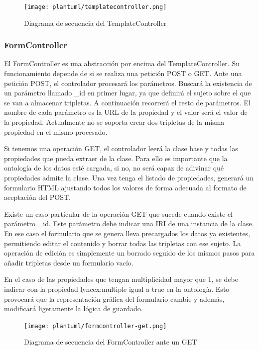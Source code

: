 \documentclass[12pt]{report} %
\begin{document}
\begin{figure}
    \centering
    \texttt{[image: plantuml/templatecontroller.png]}
    \caption{Diagrama de secuencia del TemplateController}
    \label{fig:templatecontroller}
\end{figure}

\subsubsection{FormController}
El FormController es una abstracción por encima del TemplateController.
Su funcionamiento depende de si se realiza una petición POST o GET. Ante una petición POST, el controlador procesará los parámetros.
Buscará la existencia de un parámetro llamado \_id en primer lugar, ya que definirá el sujeto sobre el que se van a almacenar tripletas.
A continuación recorrerá el resto de parámetros. El nombre de cada parámetro es la URL de la propiedad y el valor será el valor de la propiedad.
Actualmente no se soporta crear dos tripletas de la misma propiedad en el mismo procesado.

Si tenemos una operación GET, el controlador leerá la clase base y todas las propiedades que pueda extraer de la clase. Para ello es importante que la ontología de los datos esté cargada, si no, no será capaz de adivinar qué propiedades admite la clase.
Una vez tenga el listado de propiedades, generará un formulario HTML ajustando todos los valores de forma adecuada al formato de aceptación del POST.

Existe un caso particular de la operación GET que sucede cuando existe el parámetro \_id. Este parámetro debe indicar una IRI de una instancia de la clase. En ese caso el formulario que se genera lleva precargados los datos ya existentes, permitiendo editar el contenido y borrar todas las tripletas con ese sujeto. La operación de edición es simplemente un borrado seguido de los mismos pasos para añadir tripletas desde un formulario vacío.

En el caso de las propiedades que tengan multiplicidad mayor que 1, se debe indicar con la propiedad lyncex:multiple igual a true en la ontología. Esto provocará que la representación gráfica del formulario cambie y además, modificará ligeramente la lógica de guardado.

\begin{figure}
    \centering
    \texttt{[image: plantuml/formcontroller-get.png]}
    \caption{Diagrama de secuencia del FormController ante un GET}
    \label{fig:formcontrollerget}
\end{figure}
\end{document}

